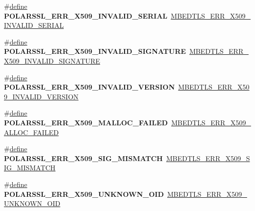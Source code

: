 \begin{DoxyCompactItemize}
\item 
\mbox{\label{compat-1_83_8h_a5dfc778ab9a1d46f8c31296050fb0e84}} 
\#\hyperlink{structdefine}{define} {\bfseries P\+O\+L\+A\+R\+S\+S\+L\+\_\+\+E\+R\+R\+\_\+\+X509\+\_\+\+I\+N\+V\+A\+L\+I\+D\+\_\+\+S\+E\+R\+I\+AL}~\hyperlink{group__x509__module_ga8124a68edabf35ed9323880584128f16}{M\+B\+E\+D\+T\+L\+S\+\_\+\+E\+R\+R\+\_\+\+X509\+\_\+\+I\+N\+V\+A\+L\+I\+D\+\_\+\+S\+E\+R\+I\+AL}
\item 
\mbox{\label{compat-1_83_8h_a56da6070740e4f0e102fd473dbe54b8c}} 
\#\hyperlink{structdefine}{define} {\bfseries P\+O\+L\+A\+R\+S\+S\+L\+\_\+\+E\+R\+R\+\_\+\+X509\+\_\+\+I\+N\+V\+A\+L\+I\+D\+\_\+\+S\+I\+G\+N\+A\+T\+U\+RE}~\hyperlink{group__x509__module_ga022c175386f082b4e056e6268ee68cab}{M\+B\+E\+D\+T\+L\+S\+\_\+\+E\+R\+R\+\_\+\+X509\+\_\+\+I\+N\+V\+A\+L\+I\+D\+\_\+\+S\+I\+G\+N\+A\+T\+U\+RE}
\item 
\mbox{\label{compat-1_83_8h_a7fb5d1b9bb950f41cf57a6e156a318ff}} 
\#\hyperlink{structdefine}{define} {\bfseries P\+O\+L\+A\+R\+S\+S\+L\+\_\+\+E\+R\+R\+\_\+\+X509\+\_\+\+I\+N\+V\+A\+L\+I\+D\+\_\+\+V\+E\+R\+S\+I\+ON}~\hyperlink{group__x509__module_ga527608dc04b2c831fe5b161ec26aab76}{M\+B\+E\+D\+T\+L\+S\+\_\+\+E\+R\+R\+\_\+\+X509\+\_\+\+I\+N\+V\+A\+L\+I\+D\+\_\+\+V\+E\+R\+S\+I\+ON}
\item 
\mbox{\label{compat-1_83_8h_a60a90a6a7f6ee7a23c186d6870d8e4c8}} 
\#\hyperlink{structdefine}{define} {\bfseries P\+O\+L\+A\+R\+S\+S\+L\+\_\+\+E\+R\+R\+\_\+\+X509\+\_\+\+M\+A\+L\+L\+O\+C\+\_\+\+F\+A\+I\+L\+ED}~\hyperlink{group__x509__module_gacf6d98c6cbb76728260d1dcb1fe3bc7d}{M\+B\+E\+D\+T\+L\+S\+\_\+\+E\+R\+R\+\_\+\+X509\+\_\+\+A\+L\+L\+O\+C\+\_\+\+F\+A\+I\+L\+ED}
\item 
\mbox{\label{compat-1_83_8h_ac00b6c62043eca7ddf8809888961454b}} 
\#\hyperlink{structdefine}{define} {\bfseries P\+O\+L\+A\+R\+S\+S\+L\+\_\+\+E\+R\+R\+\_\+\+X509\+\_\+\+S\+I\+G\+\_\+\+M\+I\+S\+M\+A\+T\+CH}~\hyperlink{group__x509__module_gac489ce5e8ba417bcd86012ebbb7f5044}{M\+B\+E\+D\+T\+L\+S\+\_\+\+E\+R\+R\+\_\+\+X509\+\_\+\+S\+I\+G\+\_\+\+M\+I\+S\+M\+A\+T\+CH}
\item 
\mbox{\label{compat-1_83_8h_a55c4c1d62914da0514be0e48c02a91f6}} 
\#\hyperlink{structdefine}{define} {\bfseries P\+O\+L\+A\+R\+S\+S\+L\+\_\+\+E\+R\+R\+\_\+\+X509\+\_\+\+U\+N\+K\+N\+O\+W\+N\+\_\+\+O\+ID}~\hyperlink{group__x509__module_gab4e8e2e41bfe62e969343efaa2784103}{M\+B\+E\+D\+T\+L\+S\+\_\+\+E\+R\+R\+\_\+\+X509\+\_\+\+U\+N\+K\+N\+O\+W\+N\+\_\+\+O\+ID}

\end{DoxyCompactItemize}
